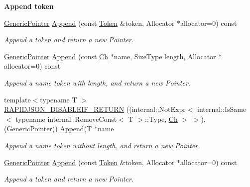 \begin{Indent}{\bf Append token}\par
\begin{DoxyCompactItemize}
\item 
\hyperlink{class_generic_pointer}{Generic\+Pointer} \hyperlink{class_generic_pointer_a6d55ac55724890527e583f26b2774f02}{Append} (const \hyperlink{struct_generic_pointer_1_1_token}{Token} \&token, Allocator $\ast$allocator=0) const 
\begin{DoxyCompactList}\small\item\em Append a token and return a new Pointer. \end{DoxyCompactList}\item 
\hyperlink{class_generic_pointer}{Generic\+Pointer} \hyperlink{class_generic_pointer_a0f2c0586fd945bf25a5da228d085f74b}{Append} (const \hyperlink{class_generic_pointer_ab292356c11b4015c98d21b966b11f285}{Ch} $\ast$name, Size\+Type length, Allocator $\ast$allocator=0) const 
\begin{DoxyCompactList}\small\item\em Append a name token with length, and return a new Pointer. \end{DoxyCompactList}\item 
{\footnotesize template$<$typename T $>$ }\\\hyperlink{class_generic_pointer_aaf4d7d852098878d24188d134182d42f}{R\+A\+P\+I\+D\+J\+S\+O\+N\+\_\+\+D\+I\+S\+A\+B\+L\+E\+I\+F\+\_\+\+R\+E\+T\+U\+RN} ((internal\+::\+Not\+Expr$<$ internal\+::\+Is\+Same$<$ typename internal\+::\+Remove\+Const$<$ T $>$\+::Type, \hyperlink{class_generic_pointer_ab292356c11b4015c98d21b966b11f285}{Ch} $>$ $>$),(\hyperlink{class_generic_pointer}{Generic\+Pointer})) \hyperlink{class_generic_pointer_a6d55ac55724890527e583f26b2774f02}{Append}(T $\ast$name
\begin{DoxyCompactList}\small\item\em Append a name token without length, and return a new Pointer. \end{DoxyCompactList}\item 
\hyperlink{class_generic_pointer}{Generic\+Pointer} \hyperlink{class_generic_pointer_a6d55ac55724890527e583f26b2774f02}{Append} (const \hyperlink{struct_generic_pointer_1_1_token}{Token} \&token, Allocator $\ast$allocator=0) const 
\begin{DoxyCompactList}\small\item\em Append a token and return a new Pointer. \end{DoxyCompactList}\item 

\end{DoxyCompactItemize}
\end{Indent}
